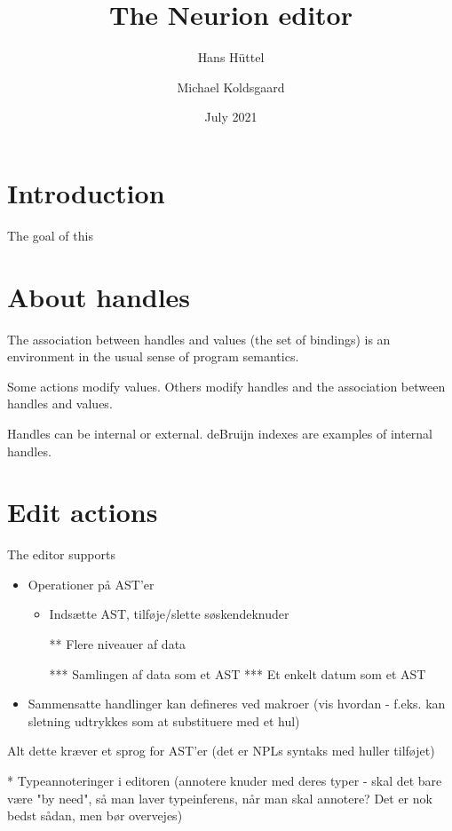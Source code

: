 \documentclass{article}
\title{The Neurion editor}
\author{Hans Hüttel \and Michael Koldsgaard}
\date{July 2021}
\begin{document}
\maketitle

\section{Introduction}

The goal of this 

\section{About handles}

The association between handles and values (the set of bindings) is an environment in the usual sense of program semantics.

Some actions modify values. Others modify handles and the association between handles and values.

Handles can be internal or external. deBruijn indexes are examples of internal handles.

\section{Edit actions}

The editor supports

\begin{itemize}
    \item Operationer på AST'er
\begin{itemize}
    \item Indsætte AST, tilføje/slette søskendeknuder
  
** Flere niveauer af data

  *** Samlingen af data som et AST
  *** Et enkelt datum som et AST

\end{itemize}
 
\item Sammensatte handlinger kan defineres ved makroer (vis hvordan -
  f.eks. kan sletning udtrykkes som at substituere med et hul)

    
\end{itemize}


Alt dette kræver et sprog for AST'er (det er NPLs syntaks med huller
tilføjet)


* Typeannoteringer i editoren (annotere knuder med deres typer -
skal det bare være "by need", så man laver typeinferens, når man skal
annotere? Det er nok bedst sådan, men bør overvejes)
\end{document}
